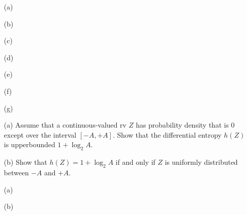 \documentclass{assignment}
\begin{document}
\begin{sol}
    \begin{itemize}
        \item[(a)] 
        \item[(b)] 
        \item[(c)] 
        \item[(d)] 
        \item[(e)] 
        \item[(f)] 
        \item[(g)] 
    \end{itemize}
\end{sol}

\begin{prob}[3.5]
    \begin{itemize}
        \item[(a)] Assume that a continuous-valued rv $Z$ has probability density that is $0$ except over the interval $[-A,+A]$. Show that the differential entropy $h(Z)$ is upperbounded $1+\log_2A$.
        \item[(b)] Show that $h(Z)=1+\log_2A$ if and only if $Z$ is uniformly distributed between $-A$ and $+A$.
    \end{itemize}
\end{prob}
\begin{sol}
    \begin{itemize}
        \item[(a)] 
        \item[(b)] 
    \end{itemize}
\end{sol}
\end{document}
